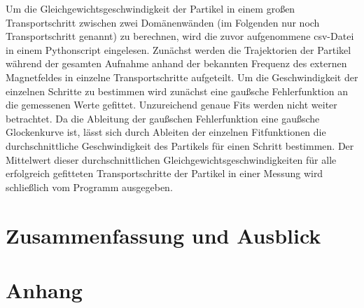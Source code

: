 \documentclass[page,pdftex,12pt,a4paper,twoside,openright]{scrbook}
\begin{document}
Um die Gleichgewichtsgeschwindigkeit der Partikel in einem großen Transportschritt zwischen zwei Domänenwänden (im Folgenden nur noch Transportschritt genannt) zu berechnen, wird die zuvor aufgenommene csv-Datei in einem Pythonscript eingelesen. Zunächst werden die Trajektorien der Partikel während der gesamten Aufnahme anhand der bekannten Frequenz des externen Magnetfeldes in einzelne Transportschritte aufgeteilt. Um die Geschwindigkeit der einzelnen Schritte zu bestimmen wird zunächst eine gaußsche Fehlerfunktion an die gemessenen Werte gefittet. Unzureichend genaue Fits werden nicht weiter betrachtet. Da die Ableitung der gaußschen Fehlerfunktion eine gaußsche Glockenkurve ist, lässt sich durch Ableiten der einzelnen  Fitfunktionen die durchschnittliche Geschwindigkeit des Partikels für einen Schritt bestimmen. Der Mittelwert dieser durchschnittlichen Gleichgewichtsgeschwindigkeiten für alle erfolgreich gefitteten Transportschritte der Partikel in einer Messung wird schließlich vom Programm ausgegeben.

\chapter{Zusammenfassung und Ausblick \label{sec-zusammenfassung}}
\label{sec:orgce3c92e}
\chapter{Anhang}
\label{sec:org5dc39f6}
\end{document}
